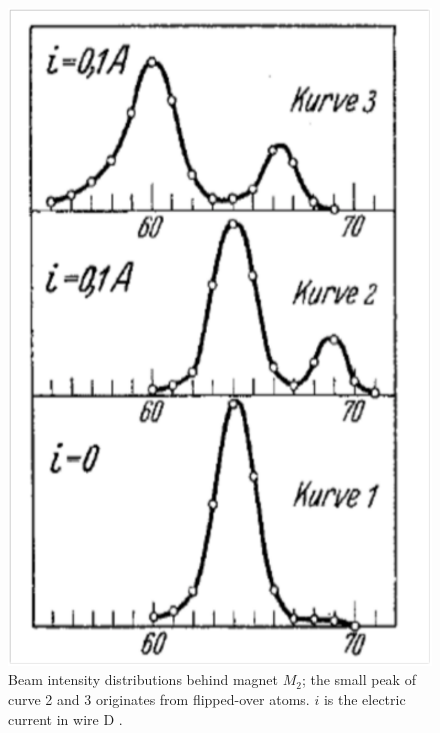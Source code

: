 \documentclass{article}
\begin{document}
%
\begin{figure}
\begin{center}
\includegraphics[scale=0.4]{figures/FrischSegreResults}
\caption{Beam intensity distributions behind magnet $M_2$; the small peak of curve 2 and 3 originates from flipped-over atoms. $i$ is the electric current in wire D \cite[p.~614]{FrischOEtal1933Einstellung}.}
\label{fig:FrischSegreResults}
\end{center}
\end{figure}
%
\end{document}
